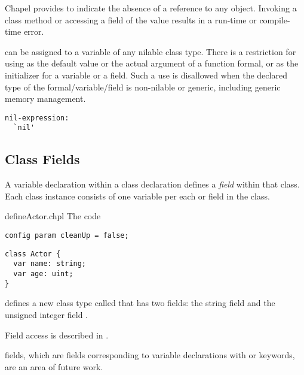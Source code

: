 Chapel provides  to indicate the absence of a reference to
any object. Invoking a class method or accessing a field of the 
value results in a run-time or compile-time error.

 can be assigned to a variable of any nilable class type.
There is a restriction for using  as the default value or
the actual argument of a function formal, or as the initializer
for a variable or a field. Such a use is disallowed
when the declared type of the formal/variable/field is non-nilable
or generic, including generic memory management.

\begin{syntax}
\begin{verbatim}
nil-expression:
  `nil'
\end{verbatim}
\end{syntax}

\subsection{Class Fields}
\label{Class_Fields}

A variable declaration within a class declaration defines
a \emph{field} within that class.
Each class instance consists of one variable per each
 or  field in the class.

\begin{chapelexample}{defineActor.chpl}
The code
\begin{chapelpre}
\begin{verbatim}
config param cleanUp = false;
\end{verbatim}
\end{chapelpre}
\begin{chapel}
\begin{verbatim}
class Actor {
  var name: string;
  var age: uint;
}
\end{verbatim}
\end{chapel}
defines a new class type called  that has two fields: the
string field  and the unsigned integer field .
\end{chapelexample}

Field access is described in .

\begin{future}
 fields, which are fields corresponding to variable declarations
with  or  keywords, are an area of future work.
\end{future}

